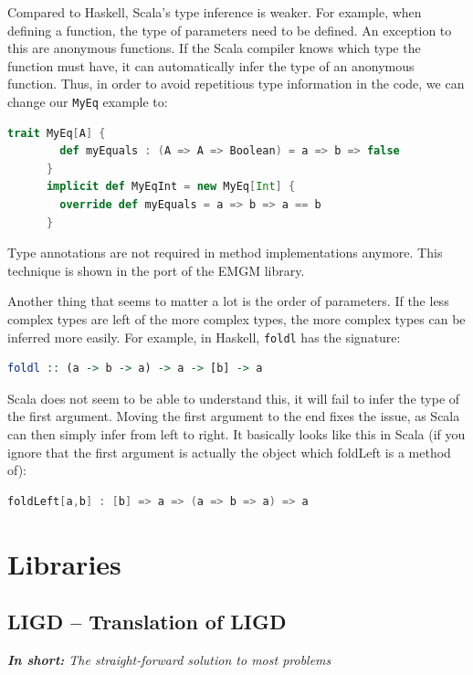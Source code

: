 \documentclass[abstracton,parskip=half]{scrreprt}
\newcommand{\cd}{\texttt}
\newcommand{\summary}[1]{\textit{\textbf{In short:} #1}}
\begin{document}
    Compared to Haskell, Scala's type inference is weaker. For example, when
    defining a function, the type of parameters need to be defined. An exception
    to this are anonymous functions. If the Scala compiler knows which type the
    function must have, it can automatically infer the type of an anonymous
    function. Thus, in order to avoid repetitious type information in the code,
    we can change our \cd{MyEq} example to:
    \begin{lstlisting}[language=Scala,gobble=6]
      trait MyEq[A] {
        def myEquals : (A => A => Boolean) = a => b => false
      }
      implicit def MyEqInt = new MyEq[Int] {
        override def myEquals = a => b => a == b
      }
    \end{lstlisting}
    Type annotations are not required in method implementations anymore. This
    technique is shown in the port of the EMGM library.

    Another thing that seems to matter a lot is the order of parameters. If
    the less complex types are left of the more complex types, the more
    complex types can be inferred more easily. For example, in Haskell,
    \cd{foldl} has the signature:
    \begin{lstlisting}[language=Haskell,gobble=6]
      foldl :: (a -> b -> a) -> a -> [b] -> a
    \end{lstlisting}
    Scala does not seem to be able to understand this, it will fail to
    infer the type of the first argument. Moving the first argument to
    the end fixes the issue, as Scala can then simply infer from left
    to right. It basically looks like this in Scala (if you ignore that
    the first argument is actually the object which foldLeft is a method
    of):
    \begin{lstlisting}[language=Scala,gobble=6]
      foldLeft[a,b] : [b] => a => (a => b => a) => a
    \end{lstlisting}


    \chapter{Libraries}

    \section{LIGD -- Translation of LIGD}
    \summary{The straight-forward solution to most problems}
    
\end{document}
